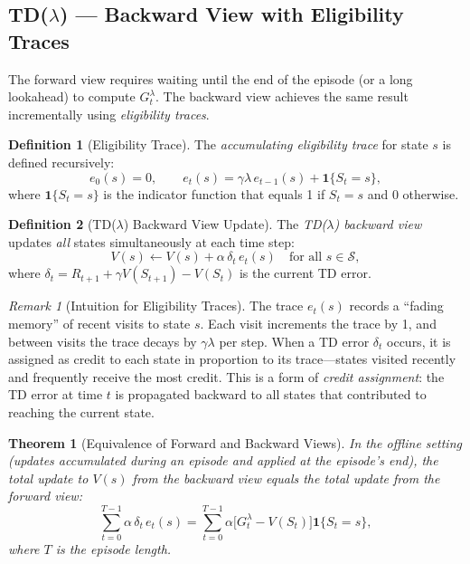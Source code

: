 \documentclass[11pt,a4paper]{article}
\theoremstyle{definition}
\newtheorem{definition}{Definition}[section]
\theoremstyle{plain}
\newtheorem{theorem}{Theorem}[section]
\theoremstyle{remark}
\newtheorem{remark}{Remark}[section]
\newcommand{\indicator}{\mathbf{1}}
\begin{document}
\subsection{TD($\lambda$) --- Backward View with Eligibility Traces}
\label{subsec:td_lambda_backward}

The forward view requires waiting until the end of the episode (or a long lookahead) to compute $G_t^\lambda$. The backward view achieves the same result incrementally using \emph{eligibility traces}.

\begin{definition}[Eligibility Trace]
\label{def:eligibility_trace}
The \emph{accumulating eligibility trace} for state $s$ is defined recursively:
\begin{equation}
    e_0(s) = 0, \qquad e_t(s) = \gamma\lambda\, e_{t-1}(s) + \indicator\{S_t = s\},
    \label{eq:eligibility_trace}
\end{equation}
where $\indicator\{S_t = s\}$ is the indicator function that equals 1 if $S_t = s$ and 0 otherwise.
\end{definition}

\begin{definition}[TD($\lambda$) Backward View Update]
\label{def:td_lambda_backward}
The \emph{TD($\lambda$) backward view} updates \emph{all} states simultaneously at each time step:
\begin{equation}
    V(s) \leftarrow V(s) + \alpha\,\delta_t\, e_t(s) \quad \text{for all } s \in \mathcal{S},
    \label{eq:td_lambda_backward}
\end{equation}
where $\delta_t = R_{t+1} + \gamma V(S_{t+1}) - V(S_t)$ is the current TD error.
\end{definition}

\begin{remark}[Intuition for Eligibility Traces]
\label{rem:trace_intuition}
The trace $e_t(s)$ records a ``fading memory'' of recent visits to state $s$. Each visit increments the trace by 1, and between visits the trace decays by $\gamma\lambda$ per step. When a TD error $\delta_t$ occurs, it is assigned as credit to each state in proportion to its trace---states visited recently and frequently receive the most credit. This is a form of \emph{credit assignment}: the TD error at time $t$ is propagated backward to all states that contributed to reaching the current state.
\end{remark}

\begin{keyresult}
\begin{theorem}[Equivalence of Forward and Backward Views]
\label{thm:forward_backward}
In the \emph{offline} setting (updates accumulated during an episode and applied at the episode's end), the total update to $V(s)$ from the backward view equals the total update from the forward view:
\begin{equation}
    \sum_{t=0}^{T-1} \alpha\,\delta_t\, e_t(s) = \sum_{t=0}^{T-1} \alpha\bigl[G_t^\lambda - V(S_t)\bigr]\indicator\{S_t = s\},
    \label{eq:forward_backward}
\end{equation}
where $T$ is the episode length.
\end{theorem}
\end{keyresult}
\end{document}
